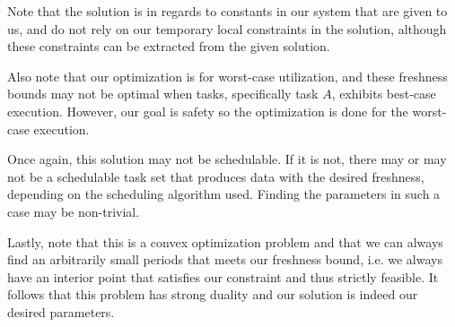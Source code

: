 Note that the solution is in regards to constants in our system that are given to us, and do not rely on our temporary local constraints in the solution, although these constraints can be extracted from the given solution.

Also note that our optimization is for worst-case utilization, and these freshness bounds may not be optimal when tasks, specifically task $A$, exhibits best-case execution. However, our goal is safety so the optimization is done for the worst-case execution.

Once again, this solution may not be schedulable. If it is not, there may or may not be a schedulable task set that produces data with the desired freshness, depending on the scheduling algorithm used. Finding the parameters in such a case may be non-trivial.

Lastly, note that this is a convex optimization problem and that we can always find an arbitrarily small periods that meets our freshness bound, i.e. we always have an interior point that satisfies our constraint and thus strictly feasible. It follows that this problem has strong duality and our solution is indeed our desired parameters.